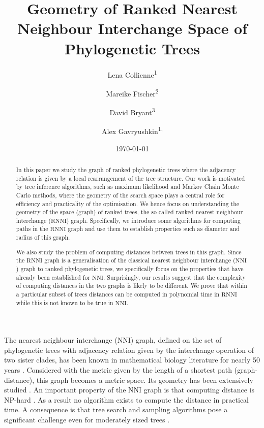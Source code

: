 \documentclass{amsart}
\title[Ranked Nearest Neighbour Intarchange]{Geometry of Ranked Nearest Neighbour Interchange Space of Phylogenetic Trees}
\date{\today}
\author{Lena Collienne\textsuperscript{1}}
\author{Mareike Fischer\textsuperscript{2}}
\author{David Bryant\textsuperscript{3}}
\author{Alex Gavryushkin\textsuperscript{1, \Letter}}
\newcommand{\np}{\mathcal{NP}}
\newcommand{\nni}{\mathrm{NNI}}
\newcommand{\rnni}{\mathrm{RNNI}}
\begin{document}
\begin{abstract}
In this paper we study the graph of ranked phylogenetic trees where the adjacency relation is given by a local rearrangement of the tree structure.
Our work is motivated by tree inference algorithms, such as maximum likelihood and Markov Chain Monte Carlo methods, where the geometry of the search space plays a central role for efficiency and practicality of the optimisation.
We hence focus on understanding the geometry of the space (graph) of ranked trees, the so-called ranked nearest neighbour interchange ($\rnni$) graph.
Specifically, we introduce some algorithms for computing paths in the $\rnni$ graph and use them to establish properties such as diameter and radius of this graph.

We also study the problem of computing distances between trees in this graph.
Since the $\rnni$ graph is a generalisation of the classical nearest neighbour interchange ($\nni$) graph to ranked phylogenetic trees, we specifically focus on the properties that have already been established for $\nni$.
Surprisingly, our results suggest that the complexity of computing distances in the two graphs is likely to be different.
We prove that within a particular subset of trees distances can be computed in polynomial time in $\rnni$ while this is not known to be true in $\nni$.
\end{abstract}


\maketitle

The nearest neighbour interchange ($\nni$) graph, defined on the set of phylogenetic trees with adjacency relation given by the interchange operation of two sister clades, has been known in mathematical biology literature for nearly 50 years \autocite{Robinson1971-ql,Moore1973-kk}.
Considered with the metric given by the length of a shortest path (graph-distance), this graph becomes a metric space.
Its geometry has been extensively studied \autocite{Dasgupta2000-xa, Li1996-zw, Gordon2013-fw, De_Jong2016-al}.
An important property of the $\nni$ graph is that computing distance is NP-hard \autocite{Dasgupta2000-xa}.
As a result no algorithm exists to compute the distance in practical time.
A consequence is that tree search and sampling algorithms pose a significant challenge even for moderately sized trees
\autocite{Whidden2016-kl}.
\end{document}
